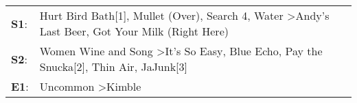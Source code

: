 \begin{supertabular}{p{0.03\textwidth}p{0.92\textwidth}}
 \textbf{S1}:  &  Hurt Bird Bath[1]\textsuperscript{}, \enspace Mullet (Over)\textsuperscript{}, \enspace Search 4\textsuperscript{}, \enspace Water\textsuperscript{} \textgreater \enspace Andy's Last Beer\textsuperscript{}, \enspace Got Your Milk (Right Here)\textsuperscript{}  \enspace  \\
 \textbf{S2}:  &             Women Wine and Song\textsuperscript{} \textgreater \enspace It's So Easy\textsuperscript{}, \enspace Blue Echo\textsuperscript{}, \enspace Pay the Snucka[2]\textsuperscript{}, \enspace Thin Air\textsuperscript{}, \enspace JaJunk[3]\textsuperscript{}  \enspace  \\
 \textbf{E1}:  &                                                                                                                                                                                             Uncommon\textsuperscript{} \textgreater \enspace Kimble\textsuperscript{}  \enspace  \\
\end{supertabular}

